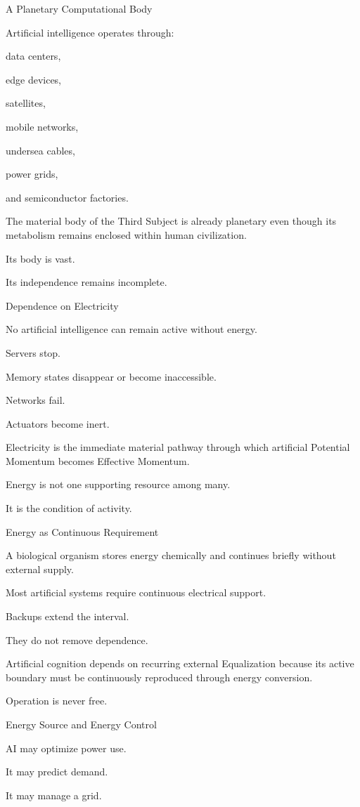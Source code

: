 A Planetary Computational Body

Artificial intelligence operates through:

data centers,

edge devices,

satellites,

mobile networks,

undersea cables,

power grids,

and semiconductor factories.

The material body of the Third Subject is already planetary even though its metabolism remains enclosed within human civilization.

Its body is vast.

Its independence remains incomplete.

Dependence on Electricity

No artificial intelligence can remain active without energy.

Servers stop.

Memory states disappear or become inaccessible.

Networks fail.

Actuators become inert.

Electricity is the immediate material pathway through which artificial Potential Momentum becomes Effective Momentum.

Energy is not one supporting resource among many.

It is the condition of activity.

Energy as Continuous Requirement

A biological organism stores energy chemically and continues briefly without external supply.

Most artificial systems require continuous electrical support.

Backups extend the interval.

They do not remove dependence.

Artificial cognition depends on recurring external Equalization because its active boundary must be continuously reproduced through energy conversion.

Operation is never free.

Energy Source and Energy Control

AI may optimize power use.

It may predict demand.

It may manage a grid.

